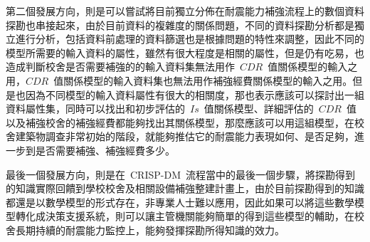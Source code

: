 

第二個發展方向，則是可以嘗試將目前獨立分佈在耐震能力補強流程上的數個資料探勘也串接起來，由於目前資料的複雜度的關係問題，不同的資料探勘分析都是獨立進行分析，包括資料前處理的資料篩選也是根據問題的特性來調整，因此不同的模型所需要的輸入資料的屬性，雖然有很大程度是相關的屬性，但是仍有吃易，也造成判斷校舍是否需要補強的的輸入資料集無法用作~$CDR$~值關係模型的輸入之用，$CDR$~值關係模型的輸入資料集也無法用作補強經費關係模型的輸入之用。但是也因為不同模型的輸入資料屬性有很大的相關度，那也表示應該可以探討出一組資料屬性集，同時可以找出和初步評估的~$Is$~值關係模型、詳細評估的~$CDR$~值以及補強校舍的補強經費都能夠找出其關係模型，那麼應該可以用這組模型，在校舍建築物調查非常初始的階段，就能夠推估它的耐震能力表現如何、是否足夠，進一步到是否需要補強、補強經費多少。

最後一個發展方向，則是在~CRISP-DM~流程當中的最後一個步驟，將探勘得到的知識實際回饋到學校校舍及相關設備補強整建計畫上，由於目前探勘得到的知識都還是以數學模型的形式存在，非專業人士難以應用，因此如果可以將這些數學模型轉化成決策支援系統，則可以讓主管機關能夠簡單的得到這些模型的輔助，在校舍長期持續的耐震能力監控上，能夠發揮探勘所得知識的效力。





